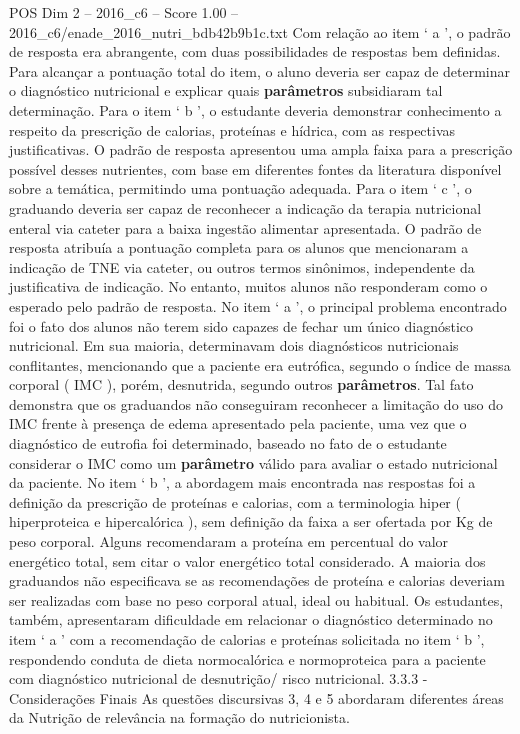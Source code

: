 \begin{textsample}{POS Dim 2 – 2016\_c6 – Score 1.00 – 2016\_c6/enade\_2016\_nutri\_bdb42b9b1c.txt}
Com relação ao item ‘ a ’, o padrão de resposta era abrangente, com duas possibilidades de respostas bem definidas.
Para alcançar a pontuação total do item, o aluno deveria ser capaz de determinar o diagnóstico nutricional e explicar quais \textbf{parâmetros} subsidiaram tal determinação.
Para o item ‘ b ’, o estudante deveria demonstrar conhecimento a respeito da prescrição de calorias, proteínas e hídrica, com as respectivas justificativas.
O padrão de resposta apresentou uma ampla faixa para a prescrição possível desses nutrientes, com base em diferentes fontes da literatura disponível sobre a temática, permitindo uma pontuação adequada.
Para o item ‘ c ’, o graduando deveria ser capaz de reconhecer a indicação da terapia nutricional enteral via cateter para a baixa ingestão alimentar apresentada.
O padrão de resposta atribuía a pontuação completa para os alunos que mencionaram a indicação de TNE via cateter, ou outros termos sinônimos, independente da justificativa de indicação.
No entanto, muitos alunos não responderam como o esperado pelo padrão de resposta.
No item ‘ a ’, o principal problema encontrado foi o fato dos alunos não terem sido capazes de fechar um único diagnóstico nutricional.
Em sua maioria, determinavam dois diagnósticos nutricionais conflitantes, mencionando que a paciente era eutrófica, segundo o índice de massa corporal ( IMC ), porém, desnutrida, segundo outros \textbf{parâmetros}.
Tal fato demonstra que os graduandos não conseguiram reconhecer a limitação do uso do IMC frente à presença de edema apresentado pela paciente, uma vez que o diagnóstico de eutrofia foi determinado, baseado no fato de o estudante considerar o IMC como um \textbf{parâmetro} válido para avaliar o estado nutricional da paciente.
No item ‘ b ’, a abordagem mais encontrada nas respostas foi a definição da prescrição de proteínas e calorias, com a terminologia hiper ( hiperproteica e hipercalórica ), sem definição da faixa a ser ofertada por Kg de peso corporal.
Alguns recomendaram a proteína em percentual do valor energético total, sem citar o valor energético total considerado.
A maioria dos graduandos não especificava se as recomendações de proteína e calorias deveriam ser realizadas com base no peso corporal atual, ideal ou habitual.
Os estudantes, também, apresentaram dificuldade em relacionar o diagnóstico determinado no item ‘ a ’ com a recomendação de calorias e proteínas solicitada no item ‘ b ’, respondendo conduta de dieta normocalórica e normoproteica para a paciente com diagnóstico nutricional de desnutrição/ risco nutricional. 3.3.3 - Considerações Finais As questões discursivas 3, 4 e 5 abordaram diferentes áreas da Nutrição de relevância na formação do nutricionista.

\end{textsample}
